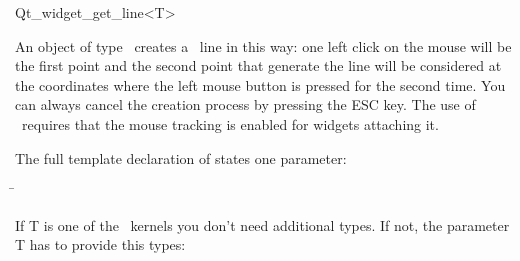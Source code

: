 
\begin{ccRefClass}{Qt_widget_get_line<T>}

\ccDefinition
An object of type \ccRefName\ creates a \cgal\ line in this way: one 
left click on the mouse will be the first point and the second point 
that generate the line will be considered at the coordinates where the left
mouse button is pressed for the second time.
You can always cancel the creation process by pressing the ESC
key. The use of \ccRefName\ requires that the mouse tracking is
enabled for widgets attaching it.


\ccParameters

The full template declaration of  states one parameter:

\begin{tabbing}
 \=\\
\end{tabbing}

If T is one of the \cgal\ kernels you don't need additional types. If
not, the parameter T has to provide this types:

\ccTypes
{}

\ccInheritsFrom
{}

\ccGlue

\ccCreation
{}


\end{ccRefClass}









